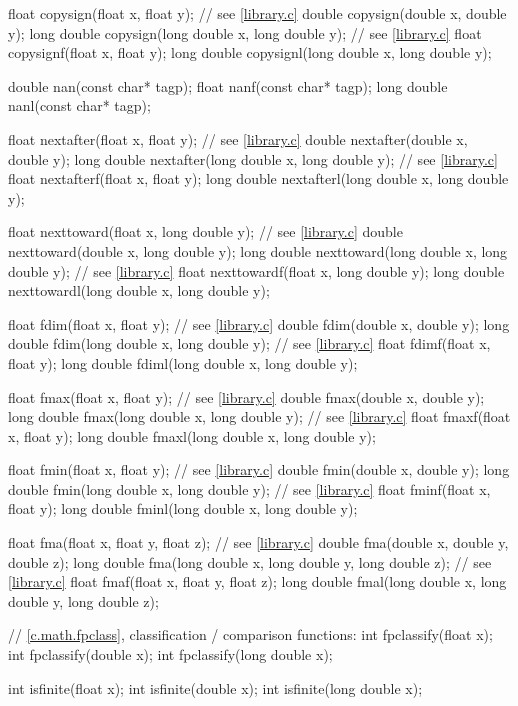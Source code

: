 \begin{codeblock}
{  float copysign(float x, float y);  // see \ref{library.c}
  double copysign(double x, double y);
  long double copysign(long double x, long double y);  // see \ref{library.c}
  float copysignf(float x, float y);
  long double copysignl(long double x, long double y);

  double nan(const char* tagp);
  float nanf(const char* tagp);
  long double nanl(const char* tagp);

  float nextafter(float x, float y);  // see \ref{library.c}
  double nextafter(double x, double y);
  long double nextafter(long double x, long double y);  // see \ref{library.c}
  float nextafterf(float x, float y);
  long double nextafterl(long double x, long double y);

  float nexttoward(float x, long double y);  // see \ref{library.c}
  double nexttoward(double x, long double y);
  long double nexttoward(long double x, long double y);  // see \ref{library.c}
  float nexttowardf(float x, long double y);
  long double nexttowardl(long double x, long double y);

  float fdim(float x, float y);  // see \ref{library.c}
  double fdim(double x, double y);
  long double fdim(long double x, long double y);  // see \ref{library.c}
  float fdimf(float x, float y);
  long double fdiml(long double x, long double y);

  float fmax(float x, float y);  // see \ref{library.c}
  double fmax(double x, double y);
  long double fmax(long double x, long double y);  // see \ref{library.c}
  float fmaxf(float x, float y);
  long double fmaxl(long double x, long double y);

  float fmin(float x, float y);  // see \ref{library.c}
  double fmin(double x, double y);
  long double fmin(long double x, long double y);  // see \ref{library.c}
  float fminf(float x, float y);
  long double fminl(long double x, long double y);

  float fma(float x, float y, float z);  // see \ref{library.c}
  double fma(double x, double y, double z);
  long double fma(long double x, long double y, long double z);  // see \ref{library.c}
  float fmaf(float x, float y, float z);
  long double fmal(long double x, long double y, long double z);

  // \ref{c.math.fpclass}, classification / comparison functions:
  int fpclassify(float x);
  int fpclassify(double x);
  int fpclassify(long double x);

  int isfinite(float x);
  int isfinite(double x);
  int isfinite(long double x);

}
\end{codeblock}
